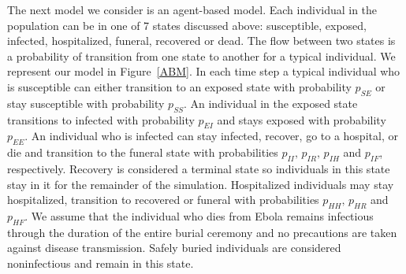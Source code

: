 The next model we consider is an agent-based model. Each individual in the population can be in one of 7 states discussed above: susceptible, exposed, infected, hospitalized, funeral, recovered or dead. The flow between two states is a  probability of transition from one state to another for a typical individual. We represent our model in Figure~\ref{ABM}. In each time step a typical individual who is susceptible can either transition to an exposed state with probability $p_{SE}$ or stay susceptible with probability $p_{SS}$. An individual in the exposed state transitions to infected with probability $p_{EI}$ and stays exposed with probability $p_{EE}$. An individual who is infected can stay infected, recover, go to a hospital, or die and transition to the funeral state with probabilities $p_{II},\, p_{IR},\, p_{IH}$ and $p_{IF}$, respectively. Recovery is considered a terminal state so individuals in this state stay in it for the remainder of the simulation. Hospitalized individuals may stay hospitalized, transition to recovered or funeral with probabilities $p_{HH}, \, p_{HR}$ and $p_{HF}$. We assume that the individual who dies from Ebola remains infectious through the duration of the entire burial ceremony and no precautions are taken against disease transmission. Safely buried individuals are considered noninfectious and remain in this state.  


